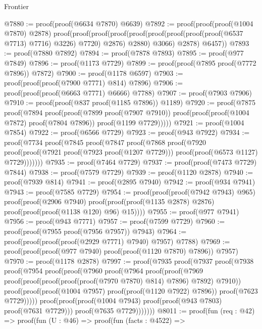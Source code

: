 \begin{lexlean}{Frontier}
\begin{coremodule}
@7880 := proof(proof(@6634 @7870) @6639)
@7892 := proof(proof(proof(@1004 @7870) @2878)
      proof(proof(proof(proof(proof(proof(proof(proof(proof(@6537 @7713) @7716) @3226) @7720) @2876)
                @2880)
              @3066)
            @2878)
          @6457))
@7893 := proof(@7880 @7892)
@7894 := proof(@7878 @7893)
@7895 := proof(@977 @7849)
@7896 := proof(@1173 @7729)
@7899 := proof(proof(@7895 proof(@7772 @7896)) @7872)
@7900 := proof(@1178 @6597)
@7903 := proof(proof(proof(@7900 @7771) @814) @7896)
@7906 := proof(proof(proof(@6663 @7771) @6666) @7788)
@7907 := proof(@7903 @7906)
@7910 := proof(proof(@837 proof(@1185 @7896)) @1189)
@7920 := proof(@7875
      proof(@7894
          proof(proof(@7899 proof(@7907 @7910))
              proof(proof(proof(@1004 @7872) proof(@7804 @7896)) proof(@1199 @7729)))))
@7921 := proof(@1004 @7854)
@7922 := proof(@6566 @7729)
@7923 := proof(@943 @7922)
@7934 := proof(@7734
      proof(@7845
          proof(@7847
              proof(@7868
                  proof(@7920
                      proof(proof(@7921 proof(@7923 proof(@1207 @7729)))
                          proof(proof(@6573 @1127) @7729)))))))
@7935 := proof(@7464 @7729)
@7937 := proof(proof(@7473 @7729) @7844)
@7938 := proof(@7579 @7729)
@7939 := proof(@1120 @2878)
@7940 := proof(@7939 @814)
@7941 := proof(@2895 @7940)
@7942 := proof(@934 @7941)
@7943 := proof(@7585 @7729)
@7954 := proof(proof(proof(@7942 @7943) @965)
      proof(proof(@2906 @7940)
          proof(proof(proof(@1135 @2878) @2876) proof(proof(proof(@1138 @120) @96) @15))))
@7955 := proof(@977 @7941)
@7956 := proof(@943 @7771)
@7957 := proof(@7599 @7729)
@7960 := proof(proof(@7955 proof(@7956 @7957)) @7943)
@7964 := proof(proof(proof(proof(@2929 @7771) @7940) @7957) @7788)
@7969 := proof(proof(proof(@977 @7940) proof(proof(@1120 @7870) @7896)) @7957)
@7970 := proof(@1178 @2878)
@7997 := proof(@7935
      proof(@7937
          proof(@7938
              proof(@7954
                  proof(proof(@7960
                        proof(@7964
                            proof(proof(@7969
                                  proof(proof(proof(proof(proof(@7970 @7870) @814) @7896) @7892)
                                      @7910))
                                proof(proof(proof(@1004 @7957) proof(proof(@1120 @7922) @7896))
                                    proof(@7623 @7729)))))
                      proof(proof(proof(@1004 @7943) proof(proof(@943 @7803) proof(@7631 @7729)))
                          proof(@7635 @7729)))))))
@8011 := proof(fun (req : @42) =>
    proof(fun (U : @46) =>
      proof(fun (facts : @4522) =>

\end{coremodule}
\end{lexlean}
